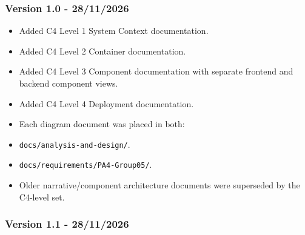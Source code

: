 \documentclass[12pt]{article}
\begin{document}
\hypertarget{sec:version-1-0-28-11-2026}{}
\subsubsection*{Version 1.0 - 28/11/2026}
\par\medskip

\begin{itemize}
\item Added C4 Level 1 System Context documentation.
\item Added C4 Level 2 Container documentation.
\item Added C4 Level 3 Component documentation with separate frontend and backend component views.
\item Added C4 Level 4 Deployment documentation.
\item Each diagram document was placed in both:
\item \texttt{docs/analysis-and-design/}.
\item \texttt{docs/requirements/PA4-Group05/}.
\item Older narrative/component architecture documents were superseded by the C4-level set.
\end{itemize}
\par\medskip

\hypertarget{sec:version-1-1-28-11-2026}{}
\subsubsection*{Version 1.1 - 28/11/2026}
\par\medskip
\end{document}
